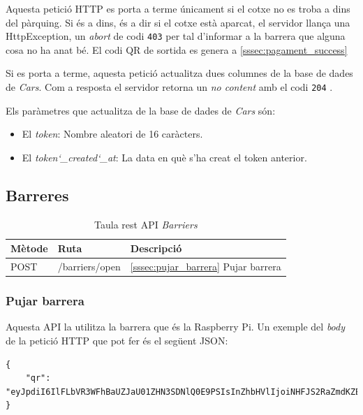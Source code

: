 Aquesta petició HTTP es porta a terme únicament si el cotxe no es troba a dins del
pàrquing. Si és a dins, és a dir si el cotxe està aparcat, el servidor
llança una HttpException, un \emph{abort} de codi \texttt{403} \autocite{http_403_response} per tal
d'informar a la barrera que alguna cosa no ha anat bé. El codi QR de sortida es genera a \autoref{sssec:pagament_success}

Si es porta a terme, aquesta petició actualitza dues columnes de la base de dades
de \emph{Cars}. Com a resposta el servidor retorna un \emph{no content} amb el codi
\texttt{204} \autocite{http_204_response}.

Els paràmetres que actualitza de la base de dades de \emph{Cars} són:
\begin{itemize}
    \item El \emph{token}: Nombre aleatori de 16 caràcters.
    \item El \emph{token\char`_created\char`_at}: La data en què s'ha creat el token anterior.
\end{itemize}

\subsection{Barreres}

\begin{table}[H]
\centering
\begin{tabular}{lll}
\hline
\textbf{Mètode} & \textbf{Ruta} & \textbf{Descripció} \\ \hline
POST            & /barriers/open &  \autoref{sssec:pujar_barrera}{ Pujar barrera}     \\ \hline
\end{tabular}
\caption{Taula rest API \emph{Barriers}}
\label{tab:my-barriers-api-table}
\end{table}

\subsubsection{Pujar barrera}
\label{sssec:pujar_barrera}

Aquesta API la utilitza la barrera que és la Raspberry Pi. Un exemple del \emph{body} de la petició HTTP
que pot fer és el següent JSON:
\begin{verbatim}
{
    "qr": "eyJpdiI6IlFLbVR3WFhBaUZJaU01ZHN3SDNlQ0E9PSIsInZhbHVlIjoiNHFJS2RaZmdKZEtQeUNZM0lkamhFVDY2QTBFZE9od0UraFNoOFltZDlhZkl3ZGtiWmRxSDdDNWZLT01Uc1dWU255YmNZV2hCdWtHaTVyTFhyck5GNHozQ2tGVUR2bmliYnpIaDNhV25PTWhuOXNXTy93MElDNUJnMXJiaEZkNmkiLCJtYWMiOiJiN2E0NmI4MTJlMzVkNjQzZmNhOTQyY2IzODQxYTIzMDc3OTc4NTdhZjZhZjlhMTQxNTdiNmU5MTg1NGNmMjZhIiwidGFnIjoiIn0=",
}
\end{verbatim}

